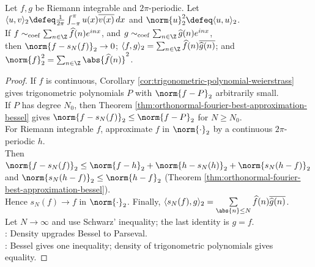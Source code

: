 \begin{theorem} \label{thm:parseval-fourier-series} \\
Let $f,g$ be Riemann integrable and $2\pi$-periodic. Let $\langle u,v\rangle_2\defeq\frac1{2\pi}\int_{-\pi}^{\pi}u(x)\overline{v(x)}\,dx$ and $\norm{u}_2^2\defeq\langle u,u\rangle_2$.\\
If $f\sim_{\mathrm{coef}}\sum_{n\in\Z}\widehat{f}(n)e^{inx}$, and $g\sim_{\mathrm{coef}}\sum_{n\in\Z}\widehat{g}(n)e^{inx}$,\\
then $\norm{f-s_N(f)}_2\to0$; $\langle f,g\rangle_2=\sum_{n\in\Z}\widehat{f}(n)\overline{\widehat{g}(n)}$; and $\norm{f}_2^2=\sum_{n\in\Z}\abs{\widehat{f}(n)}^2$.
\begin{proof}
If $f$ is continuous, Corollary \ref{cor:trigonometric-polynomial-weierstrass} gives trigonometric polynomials $P$ with $\norm{f-P}_2$ arbitrarily small.\\
If $P$ has degree $N_0$, then Theorem \ref{thm:orthonormal-fourier-best-approximation-bessel} gives $\norm{f-s_N(f)}_2\leq\norm{f-P}_2$ for $N\geq N_0$.\\
For Riemann integrable $f$, approximate $f$ in $\norm{\cdot}_2$ by a continuous $2\pi$-periodic $h$.\\
Then $\norm{f-s_N(f)}_2 \leq \norm{f-h}_2+\norm{h-s_N(h)}_2+\norm{s_N(h-f)}_2$ and $\norm{s_N(h-f)}_2\leq\norm{h-f}_2$ (Theorem \ref{thm:orthonormal-fourier-best-approximation-bessel}).\\
Hence $s_N(f)\to f$ in $\norm{\cdot}_2$. Finally, $\langle s_N(f),g\rangle_2 =\sum\limits_{\abs{n}\leq N}\widehat{f}(n)\overline{\widehat{g}(n)}$.\\
Let $N\to\infty$ and use Schwarz' inequality; the last identity is $g=f$.\\
: Density upgrades Bessel to Parseval.\\
: Bessel gives one inequality; density of trigonometric polynomials gives equality.
\end{proof}
\end{theorem}

